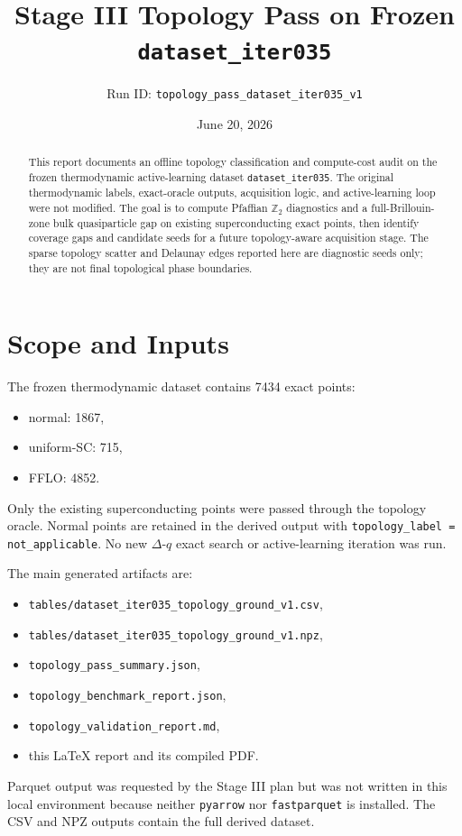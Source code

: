 \documentclass[11pt]{article}
\title{Stage III Topology Pass on Frozen \texttt{dataset\_iter035}}
\author{Run ID: \texttt{topology\_pass\_dataset\_iter035\_v1}}
\date{June 20, 2026}
\begin{document}
\maketitle

\begin{abstract}
This report documents an offline topology classification and compute-cost audit
on the frozen thermodynamic active-learning dataset \texttt{dataset\_iter035}.
The original thermodynamic labels, exact-oracle outputs, acquisition logic,
and active-learning loop were not modified.  The goal is to compute Pfaffian
$\mathbb{Z}_2$ diagnostics and a full-Brillouin-zone bulk quasiparticle gap on
existing superconducting exact points, then identify coverage gaps and
candidate seeds for a future topology-aware acquisition stage.  The sparse
topology scatter and Delaunay edges reported here are diagnostic seeds only;
they are not final topological phase boundaries.
\end{abstract}

\section{Scope and Inputs}

The frozen thermodynamic dataset contains 7434 exact points:
\begin{itemize}
  \item normal: 1867,
  \item uniform-SC: 715,
  \item FFLO: 4852.
\end{itemize}
Only the existing superconducting points were passed through the topology
oracle.  Normal points are retained in the derived output with
\texttt{topology\_label = not\_applicable}.  No new $\Delta$-$q$ exact search
or active-learning iteration was run.

The main generated artifacts are:
\begin{itemize}
  \item \texttt{tables/dataset\_iter035\_topology\_ground\_v1.csv},
  \item \texttt{tables/dataset\_iter035\_topology\_ground\_v1.npz},
  \item \texttt{topology\_pass\_summary.json},
  \item \texttt{topology\_benchmark\_report.json},
  \item \texttt{topology\_validation\_report.md},
  \item this LaTeX report and its compiled PDF.
\end{itemize}
Parquet output was requested by the Stage III plan but was not written in this
local environment because neither \texttt{pyarrow} nor \texttt{fastparquet} is
installed.  The CSV and NPZ outputs contain the full derived dataset.
\end{document}
